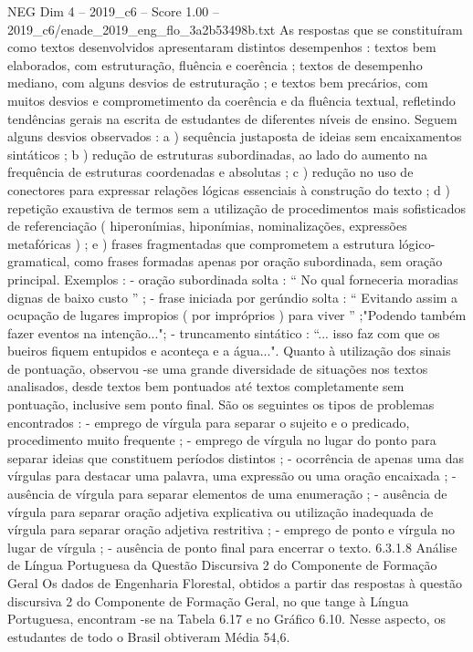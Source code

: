 \begin{textsample}{NEG Dim 4 – 2019\_c6 – Score 1.00 – 2019\_c6/enade\_2019\_eng\_flo\_3a2b53498b.txt}
As respostas que se constituíram como textos desenvolvidos apresentaram distintos desempenhos : textos bem elaborados, com estruturação, fluência e coerência ; textos de desempenho mediano, com alguns desvios de estruturação ; e textos bem precários, com muitos desvios e comprometimento da coerência e da fluência textual, refletindo tendências gerais na escrita de estudantes de diferentes níveis de ensino.
Seguem alguns desvios observados : a ) sequência justaposta de ideias sem encaixamentos sintáticos ; b ) redução de estruturas subordinadas, ao lado do aumento na frequência de estruturas coordenadas e absolutas ; c ) redução no uso de conectores para expressar relações lógicas essenciais à construção do texto ; d ) repetição exaustiva de termos sem a utilização de procedimentos mais sofisticados de referenciação ( hiperonímias, hiponímias, nominalizações, expressões metafóricas ) ; e ) frases fragmentadas que comprometem a estrutura lógico-gramatical, como frases formadas apenas por oração subordinada, sem oração principal.
Exemplos : - oração subordinada solta : “ No qual forneceria moradias dignas de baixo custo ” ; - frase iniciada por gerúndio solta : “ Evitando assim a ocupação de lugares impropios ( por impróprios ) para viver ” ;"Podendo também fazer eventos na intenção..."; - truncamento sintático : “... isso faz com que os bueiros fiquem entupidos e aconteça e a água...".
Quanto à utilização dos sinais de pontuação, observou -se uma grande diversidade de situações nos textos analisados, desde textos bem pontuados até textos completamente sem pontuação, inclusive sem ponto final.
São os seguintes os tipos de problemas encontrados : - emprego de vírgula para separar o sujeito e o predicado, procedimento muito frequente ; - emprego de vírgula no lugar do ponto para separar ideias que constituem períodos distintos ; - ocorrência de apenas uma das vírgulas para destacar uma palavra, uma expressão ou uma oração encaixada ; - ausência de vírgula para separar elementos de uma enumeração ; - ausência de vírgula para separar oração adjetiva explicativa ou utilização inadequada de vírgula para separar oração adjetiva restritiva ; - emprego de ponto e vírgula no lugar de vírgula ; - ausência de ponto final para encerrar o texto. 6.3.1.8 Análise de Língua Portuguesa da Questão Discursiva 2 do Componente de Formação Geral Os dados de Engenharia Florestal, obtidos a partir das respostas à questão discursiva 2 do Componente de Formação Geral, no que tange à Língua Portuguesa, encontram -se na Tabela 6.17 e no Gráfico 6.10.
Nesse aspecto, os estudantes de todo o Brasil obtiveram Média 54,6.

\end{textsample}
